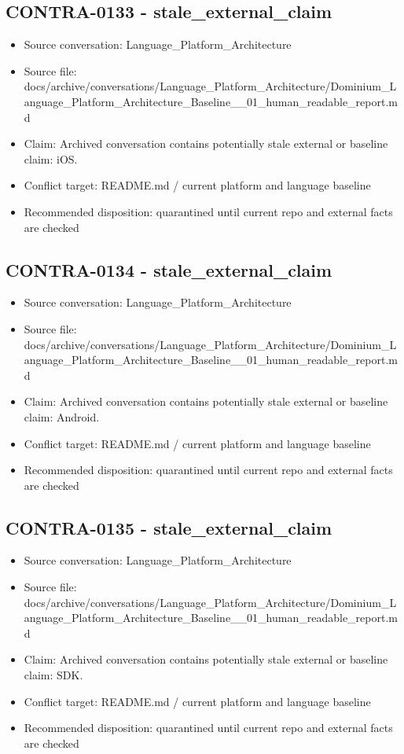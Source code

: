 \documentclass[11pt,a4paper]{report}
\begin{document}
\subsection{CONTRA-0133 - stale\_external\_claim}

\begin{itemize}
\item Source conversation: Language\_Platform\_Architecture
\item Source file: docs/archive/conversations/Language\_Platform\_Architecture/Dominium\_Language\_Platform\_Architecture\_Baseline\_\_01\_human\_readable\_report.md
\item Claim: Archived conversation contains potentially stale external or baseline claim: iOS.
\item Conflict target: README.md / current platform and language baseline
\item Recommended disposition: quarantined until current repo and external facts are checked
\end{itemize}

\subsection{CONTRA-0134 - stale\_external\_claim}

\begin{itemize}
\item Source conversation: Language\_Platform\_Architecture
\item Source file: docs/archive/conversations/Language\_Platform\_Architecture/Dominium\_Language\_Platform\_Architecture\_Baseline\_\_01\_human\_readable\_report.md
\item Claim: Archived conversation contains potentially stale external or baseline claim: Android.
\item Conflict target: README.md / current platform and language baseline
\item Recommended disposition: quarantined until current repo and external facts are checked
\end{itemize}

\subsection{CONTRA-0135 - stale\_external\_claim}

\begin{itemize}
\item Source conversation: Language\_Platform\_Architecture
\item Source file: docs/archive/conversations/Language\_Platform\_Architecture/Dominium\_Language\_Platform\_Architecture\_Baseline\_\_01\_human\_readable\_report.md
\item Claim: Archived conversation contains potentially stale external or baseline claim: SDK.
\item Conflict target: README.md / current platform and language baseline
\item Recommended disposition: quarantined until current repo and external facts are checked
\end{itemize}
\end{document}
